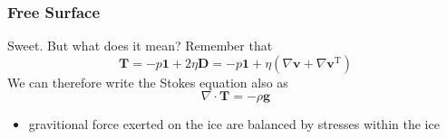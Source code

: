 \documentclass[hide notes,intlimits]{beamer}
\begin{document}
\begin{frame}
  \frametitle{Free Surface}
  Sweet. But what does it mean?
  Remember that 
  \begin{equation*}\mathbf{T} =  -p\mathbf{1} + 2\eta \mathbf{D} = -p\mathbf{1} + \eta\left(\nabla \mathbf{v} + \nabla \mathbf{v}^{\text{T}}\right)
  \end{equation*}
  We can therefore write the Stokes equation also as
 \begin{equation*}
    \nabla \cdot \mathbf{T} = - \rho \mathbf{g}
  \end{equation*}
  \begin{itemize}
    \item gravitional force exerted on the ice are balanced by stresses within the ice
  \end{itemize}
\end{frame}
\end{document}

